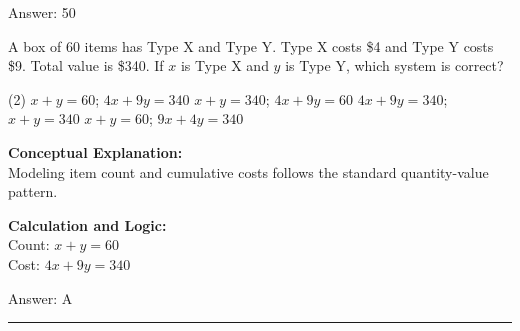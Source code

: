 \documentclass[11pt,paper=a4,answers]{exam}
\begin{document}
\begin{questions}
\begin{solution}
\vspace{15pt}
Answer: \colorbox{yellow!100}{50}
\end{solution}

\question
A box of 60 items has Type X and Type Y. Type X costs \$4 and Type Y costs \$9. Total value is \$340. If $x$ is Type X and $y$ is Type Y, which system is correct?
\begin{tasks}(2)
    \task $x + y = 60$; $4x + 9y = 340$
    \task $x + y = 340$; $4x + 9y = 60$
    \task $4x + 9y = 340$; $x + y = 340$
    \task $x + y = 60$; $9x + 4y = 340$
\end{tasks}

\begin{solution}
\textbf{Conceptual Explanation:} \\
Modeling item count and cumulative costs follows the standard quantity-value pattern.

\vspace{10pt}
\textbf{Calculation and Logic:} \\
Count: $x + y = 60$ \\
Cost: $4x + 9y = 340$

\vspace{15pt}
Answer: \colorbox{yellow!100}{A}
\end{solution}

\end{questions}
\begin{center}
\rule{.5\textwidth}{1pt}
\end{center}
\end{document}
